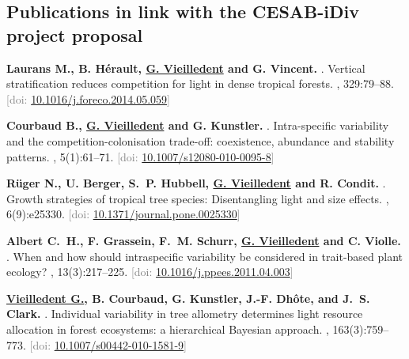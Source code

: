 \documentclass[10pt,a4paper,sans]{moderncv}
\newcounter{enumiv_gv}
\begin{document}
\vspace{0.3cm}
\subsection{Publications in link with the CESAB-iDiv project proposal}

\begin{thebibliography}{5}

\setcounter{enumiv}{9}
\textbf{Laurans M., B. Hérault, \underline{G. Vieilledent} and G. Vincent.}
.
\newblock Vertical stratification reduces competition for light in dense tropical forests.
, 329:79--88.
\newblock \textcolor{gray}{[doi: \href{https://doi.org/10.1016/j.foreco.2014.05.059}{10.1016/j.foreco.2014.05.059}]}

\setcounter{enumiv}{8}
\textbf{Courbaud B., \underline{G. Vieilledent} and G. Kunstler.}
.
\newblock Intra-specific variability and the competition-colonisation trade-off: coexistence, abundance and stability patterns.
, 5(1):61--71.
\newblock \textcolor{gray}{[doi: \href{http://dx.doi.org/10.1007/s12080-010-0095-8}{10.1007/s12080-010-0095-8}]}

\setcounter{enumiv}{7}
\textbf{Rüger N., U. Berger, S.~P. Hubbell, \underline{G. Vieilledent} and R.
  Condit.}
.
\newblock Growth strategies of tropical tree species: Disentangling light and
  size effects.
, 6(9):e25330.
\newblock \textcolor{gray}{[doi: \href{http://dx.doi.org/10.1371/journal.pone.0025330}{10.1371/journal.pone.0025330}]}

\setcounter{enumiv}{6}
\textbf{Albert C.~H., F. Grassein, F.~M. Schurr, \underline{G. Vieilledent} and
  C. Violle.}
.
\newblock When and how should intraspecific variability be considered in
  trait-based plant ecology?
,
  13(3):217--225.
\newblock \textcolor{gray}{[doi: \href{http://dx.doi.org/10.1016/j.ppees.2011.04.003}{10.1016/j.ppees.2011.04.003}]}

\setcounter{enumiv}{5}
\textbf{\underline{Vieilledent G.}, B. Courbaud, G. Kunstler, J.-F. Dhôte, and J.~S. Clark.}
.
\newblock Individual variability in tree allometry determines light resource
  allocation in forest ecosystems: a hierarchical Bayesian approach.
, 163(3):759--773.
\newblock \textcolor{gray}{[doi: \href{http://dx.doi.org/10.1007/s00442-010-1581-9}{10.1007/s00442-010-1581-9}]}

\end{thebibliography}
\end{document}
